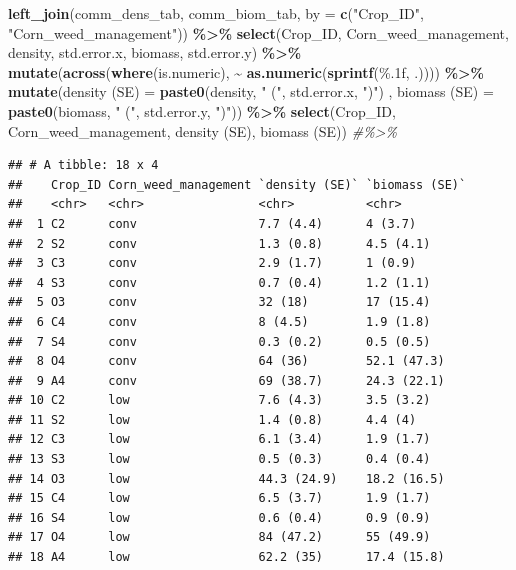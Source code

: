 \documentclass[
]{article}
\newenvironment{Shaded}{\begin{snugshade}}{\end{snugshade}}
\newcommand{\AttributeTok}[1]{\textcolor[rgb]{0.13,0.29,0.53}{#1}}
\newcommand{\CommentTok}[1]{\textcolor[rgb]{0.56,0.35,0.01}{\textit{#1}}}
\newcommand{\FunctionTok}[1]{\textcolor[rgb]{0.13,0.29,0.53}{\textbf{#1}}}
\newcommand{\NormalTok}[1]{#1}
\newcommand{\OtherTok}[1]{\textcolor[rgb]{0.56,0.35,0.01}{#1}}
\newcommand{\SpecialCharTok}[1]{\textcolor[rgb]{0.81,0.36,0.00}{\textbf{#1}}}
\newcommand{\StringTok}[1]{\textcolor[rgb]{0.31,0.60,0.02}{#1}}
\begin{document}
\begin{Shaded}
\begin{Highlighting}[]
\FunctionTok{left\_join}\NormalTok{(comm\_dens\_tab, comm\_biom\_tab, }\AttributeTok{by =} \FunctionTok{c}\NormalTok{(}\StringTok{"Crop\_ID"}\NormalTok{, }\StringTok{"Corn\_weed\_management"}\NormalTok{)) }\SpecialCharTok{\%\textgreater{}\%}
  \FunctionTok{select}\NormalTok{(Crop\_ID, Corn\_weed\_management,}
\NormalTok{         density, std.error.x,}
\NormalTok{         biomass, std.error.y) }\SpecialCharTok{\%\textgreater{}\%}
  \FunctionTok{mutate}\NormalTok{(}\FunctionTok{across}\NormalTok{(}\FunctionTok{where}\NormalTok{(is.numeric), }\SpecialCharTok{\textasciitilde{}} \FunctionTok{as.numeric}\NormalTok{(}\FunctionTok{sprintf}\NormalTok{(}\StringTok{\textquotesingle{}\%.1f\textquotesingle{}}\NormalTok{, .)))) }\SpecialCharTok{\%\textgreater{}\%}
  \FunctionTok{mutate}\NormalTok{(}\StringTok{\textasciigrave{}}\AttributeTok{density (SE)}\StringTok{\textasciigrave{}} \OtherTok{=} \FunctionTok{paste0}\NormalTok{(density, }\StringTok{" ("}\NormalTok{, std.error.x, }\StringTok{")"}\NormalTok{) ,}
         \StringTok{\textasciigrave{}}\AttributeTok{biomass (SE)}\StringTok{\textasciigrave{}} \OtherTok{=} \FunctionTok{paste0}\NormalTok{(biomass, }\StringTok{" ("}\NormalTok{, std.error.y, }\StringTok{")"}\NormalTok{)) }\SpecialCharTok{\%\textgreater{}\%}
  \FunctionTok{select}\NormalTok{(Crop\_ID, Corn\_weed\_management, }\StringTok{\textasciigrave{}}\AttributeTok{density (SE)}\StringTok{\textasciigrave{}}\NormalTok{,  }\StringTok{\textasciigrave{}}\AttributeTok{biomass (SE)}\StringTok{\textasciigrave{}}\NormalTok{) }\CommentTok{\#\%\textgreater{}\%}
\end{Highlighting}
\end{Shaded}

\begin{verbatim}
## # A tibble: 18 x 4
##    Crop_ID Corn_weed_management `density (SE)` `biomass (SE)`
##    <chr>   <chr>                <chr>          <chr>         
##  1 C2      conv                 7.7 (4.4)      4 (3.7)       
##  2 S2      conv                 1.3 (0.8)      4.5 (4.1)     
##  3 C3      conv                 2.9 (1.7)      1 (0.9)       
##  4 S3      conv                 0.7 (0.4)      1.2 (1.1)     
##  5 O3      conv                 32 (18)        17 (15.4)     
##  6 C4      conv                 8 (4.5)        1.9 (1.8)     
##  7 S4      conv                 0.3 (0.2)      0.5 (0.5)     
##  8 O4      conv                 64 (36)        52.1 (47.3)   
##  9 A4      conv                 69 (38.7)      24.3 (22.1)   
## 10 C2      low                  7.6 (4.3)      3.5 (3.2)     
## 11 S2      low                  1.4 (0.8)      4.4 (4)       
## 12 C3      low                  6.1 (3.4)      1.9 (1.7)     
## 13 S3      low                  0.5 (0.3)      0.4 (0.4)     
## 14 O3      low                  44.3 (24.9)    18.2 (16.5)   
## 15 C4      low                  6.5 (3.7)      1.9 (1.7)     
## 16 S4      low                  0.6 (0.4)      0.9 (0.9)     
## 17 O4      low                  84 (47.2)      55 (49.9)     
## 18 A4      low                  62.2 (35)      17.4 (15.8)
\end{verbatim}
\end{document}
